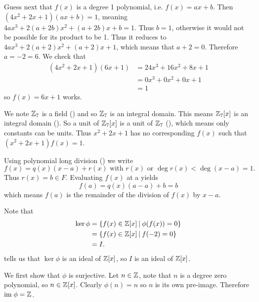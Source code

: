 \begin{questions}
\begin{partquestions}{\alph*}
        Guess next that $f(x)$ is a degree 1 polynomial, i.e. $f(x) = ax + b$. Then $(4x^2+2x+1)(ax+b) = 1$, meaning $4ax^3 + 2(a+2b)x^2 + (a+2b)x + b = 1$. Thus $b = 1$, otherwise it would not be possible for its product to be 1. Thus it reduces to $4ax^3 + 2(a+2)x^2 + (a+2)x + 1$, which means that $a+2 = 0$. Therefore $a = -2 = 6$. We check that
        \begin{align*}
            (4x^2+2x+1)(6x+1) &= 24x^3 + 16x^2 + 8x + 1\\
            &= 0x^3 + 0x^2 + 0x + 1\\
            &= 1
        \end{align*}
        so $f(x) = 6x+1$ works.
        
        \item We note $\mathbb{Z}_7$ is a field () and so $\mathbb{Z}_7$ is an integral domain. This means $\mathbb{Z}_7[x]$ is an integral domain (). So a unit of $\mathbb{Z}_7[x]$ is a unit of $\mathbb{Z}_7$ (), which means only constants can be units. Thus $x^2 + 2x + 1$ has no corresponding $f(x)$ such that $(x^2+2x+1)f(x) = 1$.
    \end{partquestions}
    
    \item Using polynomial long division () we write
    \[
        f(x) = q(x)(x-a) + r(x) \text{ with } r(x) \text{ or } \deg r(x) < \deg(x-a) = 1.
    \]
    Thus $r(x) = b \in F$. Evaluating $f(x)$ at a yields
    \[
        f(a) = q(x)(a-a) + b = b
    \]
    which means $f(a)$ is the remainder of the division of $f(x)$ by $x-a$.

    \item \begin{partquestions}{\roman*}
        \item Note that
        \begin{align*}
            \ker\phi &= \{f(x) \in \Z[x] \vert \phi(f(x)) = 0\}\\
            &= \{f(x) \in \Z[x] \vert f(-2) = 0\}\\
            &= I.
        \end{align*}
         tells us that $\ker\phi$ is an ideal of $\mathbb{Z}[x]$, so $I$ is an ideal of $\mathbb{Z}[x]$.

        \item We first show that $\phi$ is surjective. Let $n \in \mathbb{Z}$, note that $n$ is a degree zero polynomial, so $n \in \mathbb{Z}[x]$. Clearly $\phi(n) = n$ so $n$ is its own pre-image. Therefore $\mathrm{im}\;\phi = \mathbb{Z}$.
        

\end{partquestions}
\end{questions}
